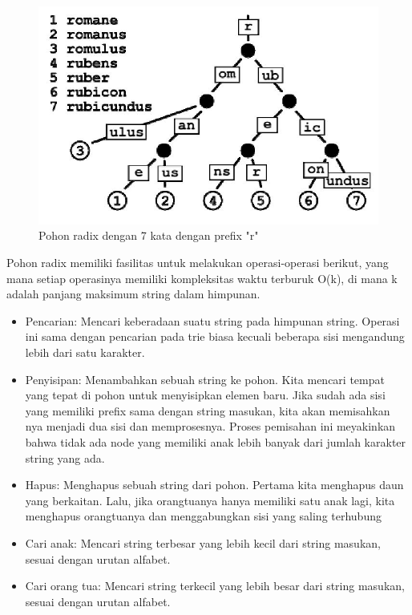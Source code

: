 \begin{figure}[H]
\centering
\includegraphics[scale=0.75]{Gambar/contoh-radix-tree}
\caption[Pohon radix dengan 7 kata dengan prefix "r"]{Pohon radix dengan 7 kata dengan prefix "r"\cite{najogie:10:trie}} 
\label{contoh-radix-tree}
\end{figure}

Pohon radix memiliki fasilitas untuk melakukan operasi-operasi berikut, yang mana setiap operasinya memiliki kompleksitas waktu terburuk O(k), di mana k adalah panjang maksimum string dalam himpunan.

\begin{itemize}
	\item Pencarian: Mencari keberadaan suatu string pada himpunan string. Operasi ini sama dengan pencarian pada trie biasa kecuali beberapa sisi mengandung lebih dari satu karakter.
	\item Penyisipan: Menambahkan sebuah string ke pohon. Kita mencari tempat yang tepat di pohon untuk menyisipkan elemen baru. Jika sudah ada sisi yang memiliki prefix sama dengan string masukan, kita akan memisahkan nya menjadi dua sisi dan memprosesnya. Proses pemisahan ini meyakinkan bahwa tidak ada node yang memiliki anak lebih banyak dari jumlah karakter string yang ada.
	\item Hapus: Menghapus sebuah string dari pohon. Pertama kita menghapus daun yang berkaitan. Lalu, jika orangtuanya hanya memiliki satu anak lagi, kita menghapus orangtuanya dan menggabungkan sisi yang saling terhubung
	\item Cari anak: Mencari string terbesar yang lebih kecil dari string masukan, sesuai dengan urutan alfabet.
	\item Cari orang tua: Mencari string terkecil yang lebih besar dari string masukan, sesuai dengan urutan alfabet.
\end{itemize}

